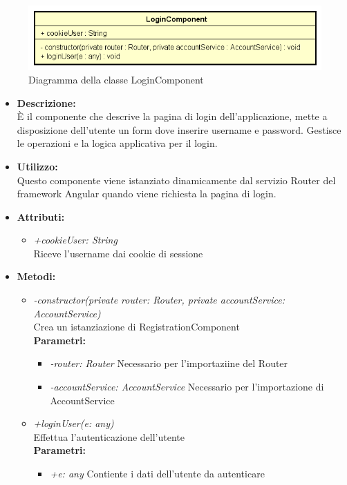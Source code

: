 \begin{figure}[h!]
	\centering
	\includegraphics[scale=0.8]{res/sections/SpecificaFrontEnd/Components/Disegnetti/login.png}
	\caption{Diagramma della classe LoginComponent}
\end{figure}

\begin{itemize}
	\item \textbf{Descrizione:}\\
	È il componente che descrive la pagina di login dell’applicazione, mette a disposizione dell’utente un form dove inserire username e password. Gestisce le operazioni e la logica applicativa per il login.
	\item \textbf{Utilizzo:}\\
	Questo componente viene istanziato dinamicamente dal servizio Router del framework Angular quando viene richiesta la pagina di login.
	\item \textbf{Attributi:}
		\begin{itemize}
			\item \emph{+cookieUser: String}\\
			Riceve l'username dai cookie di sessione
		\end{itemize}
	\item \textbf{Metodi:}
		\begin{itemize}
			\item \emph{-constructor(private router: Router, private accountService: AccountService)}\\
    		Crea un istanziazione di RegistrationComponent\\
    		\textbf{Parametri:}
    		\begin{itemize}
    			\item \emph{-router: Router}
    			Necessario per l'importaziine del Router
    			\item \emph{-accountService: AccountService}
    			Necessario per l'importazione di AccountService
    		\end{itemize}
    		\item \emph{+loginUser(e: any)}\\
    		Effettua l'autenticazione dell'utente\\
    		\textbf{Parametri:}
    		\begin{itemize}
    			\item \emph{+e: any}
    			Contiente i dati dell'utente da autenticare
    		\end{itemize}
		\end{itemize}
\end{itemize}
